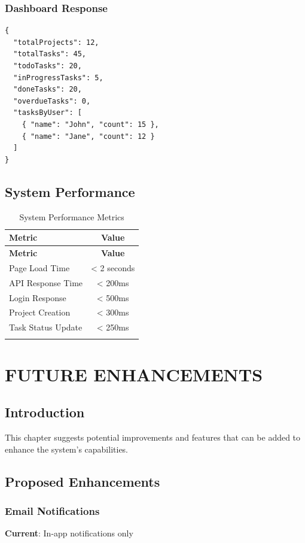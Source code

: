 \documentclass[12pt,a4paper,twoside]{book}
\begin{document}
\subsection{Dashboard Response}
\begin{lstlisting}[style=javascript]
{
  "totalProjects": 12,
  "totalTasks": 45,
  "todoTasks": 20,
  "inProgressTasks": 5,
  "doneTasks": 20,
  "overdueTasks": 0,
  "tasksByUser": [
    { "name": "John", "count": 15 },
    { "name": "Jane", "count": 12 }
  ]
}
\end{lstlisting}

\section{System Performance}

\begin{longtable}{|l|c|}
\hline
\textbf{Metric} & \textbf{Value} \\ \hline
\endfirsthead
\hline
\textbf{Metric} & \textbf{Value} \\ \hline
\endhead
Page Load Time & < 2 seconds \\ \hline
API Response Time & < 200ms \\ \hline
Login Response & < 500ms \\ \hline
Project Creation & < 300ms \\ \hline
Task Status Update & < 250ms \\ \hline
\caption{System Performance Metrics}
\end{longtable}

\chapter{FUTURE ENHANCEMENTS}

\section{Introduction}

This chapter suggests potential improvements and features that can be added to enhance the system's capabilities.

\section{Proposed Enhancements}

\subsection{Email Notifications}
\textbf{Current}: In-app notifications only
\end{document}

